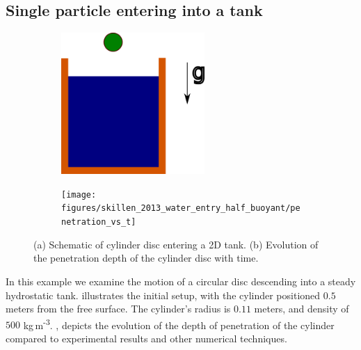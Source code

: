 \documentclass[a4paper,11pt]{book}
\begin{document}
\subsection{Single particle entering into a tank}
\label{sec:rfc_validation_1_single_particle_entry}
\begin{figure}[!htpb]
  \centering
  \begin{subfigure}{0.48\textwidth}
    \centering
    \includegraphics[width=0.6\textwidth]{
      images/rfc_01_skillen_2013_particle_entry_in_hs_tank/Skillen_2013_particle_entry_in_hs_tank}
    \subcaption{}\label{fig:result:rfc-1a}
  \end{subfigure}
  \begin{subfigure}{0.48\textwidth}
    \centering
    \texttt{[image: figures/skillen\_2013\_water\_entry\_half\_buoyant/penetration\_vs\_t]}
    \subcaption{}\label{fig:result:rfc-1b}
  \end{subfigure}
  \caption{(a) Schematic of cylinder disc entering a 2D tank.  (b) Evolution of
    the penetration depth of the cylinder disc with time. }
\label{fig:result-rfc-1}
\end{figure}
In this example we examine the motion of a circular disc descending into a
steady hydrostatic tank.  illustrates the initial setup,
with the cylinder positioned $0.5$ meters from the free surface. The cylinder's
radius is $0.11$ meters, and density of $500$ kg\,m\textsuperscript{-3}.
, depicts the evolution of the depth of penetration of
the cylinder compared to experimental results and other numerical techniques.



\end{document}
